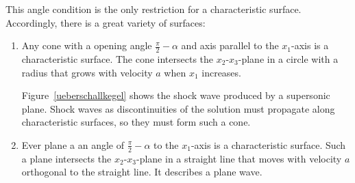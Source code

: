 This angle condition is the only restriction for a characteristic surface.
Accordingly, there is a great variety of surfaces:
\begin{enumerate}
\item
Any cone with a opening angle
$\frac{\pi}2-\alpha$
and axis parallel to the $x_1$-axis is a characteristic surface.
The cone intersects the
$x_2$-$x_3$-plane in a circle with a radius that grows with velocity $a$
when $x_1$ increases.

Figure~\ref{ueberschallkegel} shows the shock wave produced by a
supersonic plane.
Shock waves as discontinuities of the solution must propagate along
characteristic surfaces, so they must form such a cone.
\item 
Ever plane a an angle of $\frac\pi2-\alpha$ to the $x_1$-axis
is a characteristic surface.
Such a plane intersects the $x_2$-$x_3$-plane in a straight line
that moves with velocity $a$ orthogonal to the straight line.
It describes a plane wave.

\end{enumerate}


